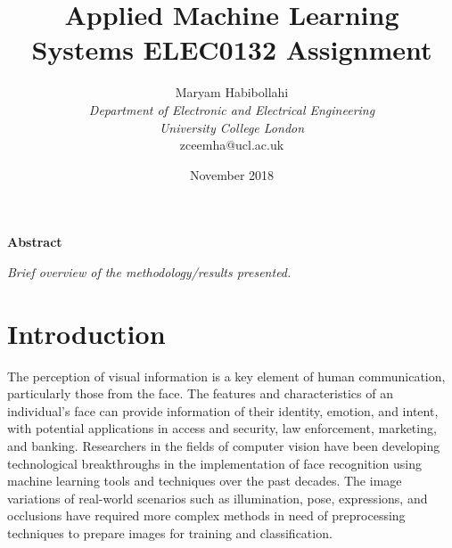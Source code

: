 \documentclass[conference]{IEEEtran}
\begin{document}
\def\code#1{\texttt{#1}}

\title{Applied Machine Learning\\
 Systems ELEC0132 Assignment}
\author{\large Maryam Habibollahi\\ \textit{Department of Electronic and Electrical Engineering}\\ \textit{University College London}\\ zceemha@ucl.ac.uk}
\date{November 2018}
\maketitle

\setcounter{page}{1} 

\begin{center} \large \textbf{Abstract} \end{center}
\textit{Brief overview of the methodology/results presented.}\\

\section{Introduction} \label{s-intro}


The perception of visual information is a key element of human communication, particularly those from the face. The features and characteristics of an individual's face can provide information of their identity, emotion, and intent, with potential applications in access and security, law enforcement, marketing, and banking. Researchers in the fields of computer vision have been developing technological breakthroughs %
in the implementation of face recognition using machine learning tools and techniques over the past decades.
The image variations of real-world scenarios such as illumination, pose, expressions, and occlusions 
have required more complex methods in need of preprocessing techniques to prepare images for training and classification. 
\end{document}
